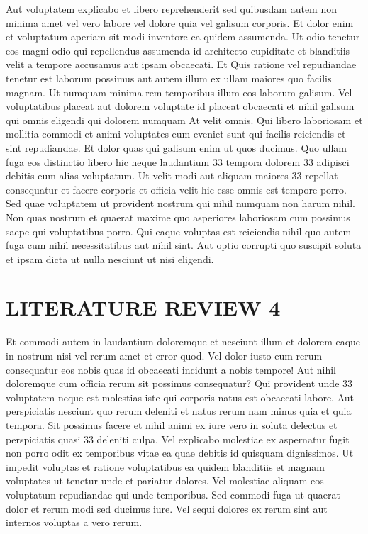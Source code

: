\documentclass[a4paper,12pt]{report}
\begin{document}
Aut voluptatem explicabo et libero reprehenderit sed quibusdam autem non minima amet vel vero labore vel dolore quia vel galisum corporis. Et dolor enim et voluptatum aperiam sit modi inventore ea quidem assumenda. Ut odio tenetur eos magni odio qui repellendus assumenda id architecto cupiditate et blanditiis velit a tempore accusamus aut ipsam obcaecati. Et Quis ratione vel repudiandae tenetur est laborum possimus aut autem illum ex ullam maiores quo facilis magnam. Ut numquam minima rem temporibus illum eos laborum galisum. Vel voluptatibus placeat aut dolorem voluptate id placeat obcaecati et nihil galisum qui omnis eligendi qui dolorem numquam At velit omnis. Qui libero laboriosam et mollitia commodi et animi voluptates eum eveniet sunt qui facilis reiciendis et sint repudiandae. Et dolor quas qui galisum enim ut quos ducimus. Quo ullam fuga eos distinctio libero hic neque laudantium 33 tempora dolorem 33 adipisci debitis eum alias voluptatum. Ut velit modi aut aliquam maiores 33 repellat consequatur et facere corporis et officia velit hic esse omnis est tempore porro. Sed quae voluptatem ut provident nostrum qui nihil numquam non harum nihil. Non quas nostrum et quaerat maxime quo asperiores laboriosam cum possimus saepe qui voluptatibus porro. Qui eaque voluptas est reiciendis nihil quo autem fuga cum nihil necessitatibus aut nihil sint. Aut optio corrupti quo suscipit soluta et ipsam dicta ut nulla nesciunt ut nisi eligendi. \par


\section{LITERATURE REVIEW 4}

\hspace{.5cm} Et commodi autem in laudantium doloremque et nesciunt illum et dolorem eaque in nostrum nisi vel rerum amet et error quod. Vel dolor iusto eum rerum consequatur eos nobis quas id obcaecati incidunt a nobis tempore! Aut nihil doloremque cum officia rerum sit possimus consequatur? Qui provident unde 33 voluptatem neque est molestias iste qui corporis natus est obcaecati labore. Aut perspiciatis nesciunt quo rerum deleniti et natus rerum nam minus quia et quia tempora. Sit possimus facere et nihil animi ex iure vero in soluta delectus et perspiciatis quasi 33 deleniti culpa. Vel explicabo molestiae ex aspernatur fugit non porro odit ex temporibus vitae ea quae debitis id quisquam dignissimos. Ut impedit voluptas et ratione voluptatibus ea quidem blanditiis et magnam voluptates ut tenetur unde et pariatur dolores. Vel molestiae aliquam eos voluptatum repudiandae qui unde temporibus. Sed commodi fuga ut quaerat dolor et rerum modi sed ducimus iure. Vel sequi dolores ex rerum sint aut internos voluptas a vero rerum.\par 
\end{document}
